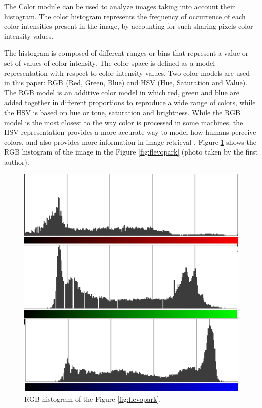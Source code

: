 \documentclass[a4paper,twoside]{article}
\begin{document}
The Color module can be used to analyze images taking into account their histogram. The color histogram represents the frequency of occurrence of each color intensities present in the image, by accounting for such sharing pixels color intensity values.

The histogram is composed of different ranges or bins that represent a value or set of values of color intensity. The color space is defined as a model representation with respect to color intensity values. Two color models are used in this paper: RGB (Red, Green, Blue) and HSV (Hue, Saturation and Value). The RGB model is an additive color model in which red, green and blue are added together in different proportions to reproduce a wide range of colors, while the HSV is based on hue or tone, saturation and brightness. While the RGB model is the most closest to the way color is processed in some machines, the HSV representation provides a more accurate way to model how humans perceive colors, and also provides more information in image retrieval \cite{COLORDIFFERENCES}.
Figure \ref{fig:histogram} shows the RGB histogram of the image in the Figure \ref{fig:flevopark} (photo taken by the first author).

\begin{figure}
\centering
   \includegraphics[scale =0.6] {images/histogram.eps}
\caption{RGB histogram of the Figure \ref{fig:flevopark}. }
\label{fig:histogram}
\end{figure}
\end{document}
